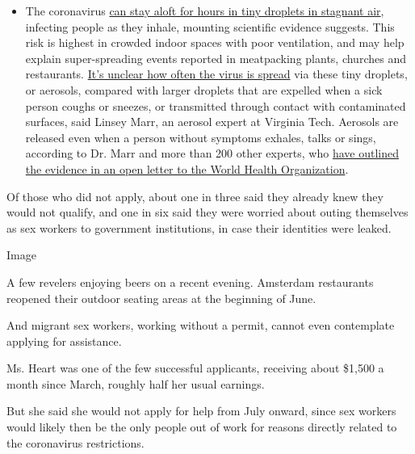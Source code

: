 \begin{itemize}
  \begin{itemize}
  \tightlist
  \item
    The coronavirus
    \href{https://www.nytimes.com/2020/07/04/health/239-experts-with-one-big-claim-the-coronavirus-is-airborne.html?action=click\&pgtype=Article\&state=default\&region=MAIN_CONTENT_3\&context=storylines_faq}{can
    stay aloft for hours in tiny droplets in stagnant air}, infecting
    people as they inhale, mounting scientific evidence suggests. This
    risk is highest in crowded indoor spaces with poor ventilation, and
    may help explain super-spreading events reported in meatpacking
    plants, churches and restaurants.
    \href{https://www.nytimes.com/2020/07/06/health/coronavirus-airborne-aerosols.html?action=click\&pgtype=Article\&state=default\&region=MAIN_CONTENT_3\&context=storylines_faq}{It's
    unclear how often the virus is spread} via these tiny droplets, or
    aerosols, compared with larger droplets that are expelled when a
    sick person coughs or sneezes, or transmitted through contact with
    contaminated surfaces, said Linsey Marr, an aerosol expert at
    Virginia Tech. Aerosols are released even when a person without
    symptoms exhales, talks or sings, according to Dr. Marr and more
    than 200 other experts, who
    \href{https://academic.oup.com/cid/article/doi/10.1093/cid/ciaa939/5867798}{have
    outlined the evidence in an open letter to the World Health
    Organization}.
  \end{itemize}
\end{itemize}

Of those who did not apply, about one in three said they already knew
they would not qualify, and one in six said they were worried about
outing themselves as sex workers to government institutions, in case
their identities were leaked.

Image

A few revelers enjoying beers on a recent evening. Amsterdam restaurants
reopened their outdoor seating areas at the beginning of June.

And migrant sex workers, working without a permit, cannot even
contemplate applying for assistance.

Ms. Heart was one of the few successful applicants, receiving about
\$1,500 a month since March, roughly half her usual earnings.

But she said she would not apply for help from July onward, since sex
workers would likely then be the only people out of work for reasons
directly related to the coronavirus restrictions.


